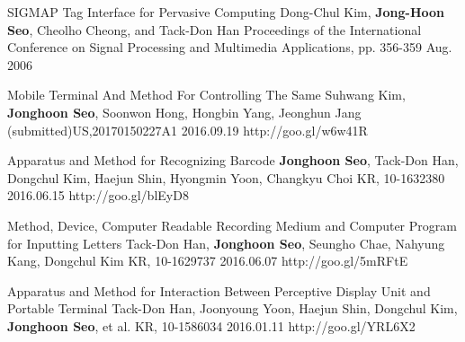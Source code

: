 \begin{cventries}
  \cvpublicationentry
    {SIGMAP} %
    {Tag Interface for Pervasive Computing} %
    {Dong-Chul Kim, \textbf{Jong-Hoon Seo}, Cheolho Cheong, and Tack-Don Han} %
    {Proceedings of the International Conference on Signal Processing and Multimedia Applications, pp. 356-359}
    {Aug. 2006} %
    {}
\end{cventries}


\begin{cventries}
  \cvpatententry
    {Mobile Terminal And Method For Controlling The Same} %
    {Suhwang Kim, \textbf{Jonghoon Seo}, Soonwon Hong, Hongbin Yang, Jeonghun Jang} %
    {(submitted)US,20170150227A1} %
    {2016.09.19} %
    {http://goo.gl/w6w41R}

  \cvpatententry
    {Apparatus and Method for Recognizing Barcode} %
    {\textbf{Jonghoon Seo}, Tack-Don Han, Dongchul Kim, Haejun Shin, Hyongmin Yoon, Changkyu Choi} %
    {KR, 10-1632380} %
    {2016.06.15} %
    {http://goo.gl/blEyD8}

  \cvpatententry
    {Method, Device, Computer Readable Recording Medium and Computer Program for Inputting Letters} %
    {Tack-Don Han, \textbf{Jonghoon Seo}, Seungho Chae, Nahyung Kang, Dongchul Kim} %
    {KR, 10-1629737} %
    {2016.06.07} %
    {http://goo.gl/5mRFtE}

  \cvpatententry
    {Apparatus and Method for Interaction Between Perceptive Display Unit and Portable Terminal} %
    {Tack-Don Han, Joonyoung Yoon, Haejun Shin, Dongchul Kim, \textbf{Jonghoon Seo}, et al.} %
    {KR, 10-1586034} %
    {2016.01.11} %
    {http://goo.gl/YRL6X2}


\end{cventries}
